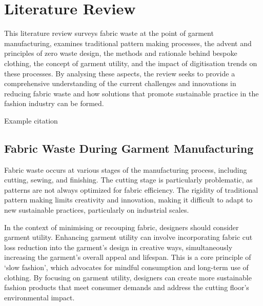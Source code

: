 \chapter{Literature Review}
This literature review surveys fabric waste at the point of garment manufacturing, examines traditional pattern making processes, the advent and principles of zero waste design, the methods and rationale behind bespoke clothing, the concept of garment utility, and the impact of digitisation trends on these processes. By analysing these aspects, the review seeks to provide a comprehensive understanding of the current challenges and innovations in reducing fabric waste and how solutions that promote sustainable practice in the fashion industry can be formed. 

Example citation \cite{aldrich_metric_2015}

\section{Fabric Waste During Garment Manufacturing}
Fabric waste occurs at various stages of the manufacturing process, including cutting, sewing, and finishing. The cutting stage is particularly problematic, as patterns are not always optimized for fabric efficiency. The rigidity of traditional pattern making limits creativity and innovation, making it difficult to adapt to new sustainable practices, particularly on industrial scales.

In the context of minimising or recouping fabric, designers should consider garment utility. Enhancing garment utility can involve incorporating fabric cut loss reduction into the garment’s design in creative ways, simultaneously increasing the garment’s overall appeal and lifespan. This is a core principle of ‘slow fashion’, which advocates for mindful consumption and long-term use of clothing. By focusing on garment utility, designers can create more sustainable fashion products that meet consumer demands and address the cutting floor's environmental impact.

